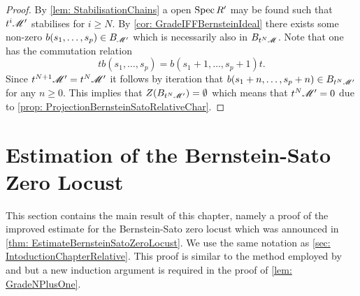 \begin{proof}
  By \cref{lem: StabilisationChains} a open $\operatorname{Spec} R'$ may be found such that $t^i \mathscr{M}'$ stabilises for $i\geq N$.
  By \cref{cor: GradeIFFBernsteinIdeal} there exists some non-zero $b(s_1,\ldots,s_p) \in B_{\mathscr{M}'}$ which is necessarily also in $B_{t^N\mathscr{M}}$.
  Note that one has the commutation relation
  $$tb(s_1,\ldots,s_p) = b(s_1+1,\ldots, s_p + 1)t.$$
  Since $t^{N+1}\mathscr{M}' = t^N\mathscr{M}'$ it follows by iteration that $b(s_1+n,\ldots, s_p + n)\in B_{t^N \mathscr{M}'}$ for any $n\geq 0$.
  This implies that $Z(B_{t^N\mathscr{M}'}) = \emptyset$ which means that $t^N\mathscr{M}' = 0$ due to \cref{prop: ProjectionBernsteinSatoRelativeChar}.
\end{proof}
\section{Estimation of the Bernstein-Sato Zero Locust}
This section contains the main result of this chapter, namely a proof of the improved estimate for the Bernstein-Sato zero locust which was announced in \cref{thm: EstimateBernsteinSatoZeroLocust}.
We use the same notation as \cref{sec: IntoductionChapterRelative}.
This proof is similar to the method employed by \cite{lichtin1989poles} and \cite{kashiwara1976b} but a new induction argument is required in the proof of \cref{lem: GradeNPlusOne}.\\

